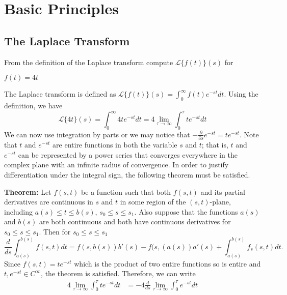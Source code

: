 \chapter{Basic Principles}

\section{The Laplace Transform}

\begin{exercise}
\item
  From the definition of the Laplace transform compute
  \(\mathcal{L}\{f(t)\}(s)\)
  for
  \begin{exercise}[label = (\alph*), ref = \arabic{exercisei} (\alph*)]
  \item
    \(f(t) = 4t\)
    \par\smallskip
    The Laplace transform is defined as
    \(\mathcal{L}\{f(t)\}(s) = \int_0^{\infty}f(t)e^{-st}dt\).
    Using the definition, we have
    \[
    \mathcal{L}\{4t\}(s) = \int_0^{\infty}4te^{-st}dt =
    4\lim_{\tau\to\infty}\int_0^{\tau}te^{-st}dt
    \]
    We can now use integration by parts or we may notice that
    \(-\frac{\partial}{\partial s}e^{-st} = te^{-st}\).
    Note that \(t\) and \(e^{-st}\) are entire functions in both the variable
    \(s\) and \(t\); that is, \(t\) and \(e^{-st}\) can be represented by a
    power series that converges everywhere in the complex plane with an
    infinite radius of convergence.
    In order to justify differentiation under the integral sign, the following
    theorem must be satisfied.
    \par\smallskip
    \textbf{Theorem:} Let \(f(s,t)\) be a function such that both \(f(s,t)\)
    and its partial derivatives are continuous in \(s\) and \(t\) in some
    region of the \((s,t)\)-plane, including \(a(s)\leq t\leq b(s)\),
    \(s_0\leq s\leq s_1\).
    Also suppose that the functions \(a(s)\) and \(b(s)\) are both continuous
    and both have continuous derivatives for \(s_0\leq s\leq s_1\).
    Then for \(s_0\leq s\leq s_1\)
    \[
    \frac{d}{ds}\int_{a(s)}^{b(s)}f(s, t)dt = f(s, b(s))b'(s) - f(s,(a(s))a'(s)
    + \int_{a(s)}^{b(s)}f_s(s, t)dt.
    \]
    Since \(f(s,t) = te^{-st}\) which is the product of two entire functions
    so is entire and \(t,e^{-st}\in C^{\infty}\), the theorem is satisfied.
    Therefore, we can write
    \begin{align*}
      4\lim_{\tau\to\infty}\int_0^{\tau}te^{-st}dt
      & = -4\frac{d}{ds}\lim_{\tau\to\infty}\int_0^{\tau}e^{-st}dt\\

\end{align*}
\end{exercise}
\end{exercise}
